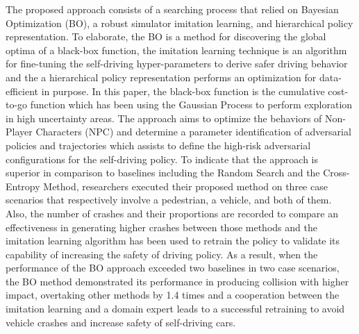 \documentclass[10pt,a4paper]{report}
\begin{document}
The proposed approach consists of a searching process that relied on Bayesian Optimization (BO), a robust simulator imitation learning, and hierarchical policy representation.
%
To elaborate, the BO is a method for discovering the global optima of a black-box function, the imitation learning technique is an algorithm for fine-tuning the self-driving hyper-parameters to derive safer driving behavior and the a hierarchical policy representation performs an optimization for data-efficient in purpose.
%
In this paper, the black-box function is the cumulative cost-to-go function which has been using the Gaussian Process to perform exploration in high uncertainty areas.
%
The approach aims to optimize the behaviors of Non-Player Characters (NPC)
%
and determine a parameter identification of adversarial policies and trajectories which assists to define the high-risk adversarial configurations for the self-driving policy. 
% 
To indicate that the approach is superior in comparison to baselines including the Random Search and the Cross-Entropy Method, researchers executed their proposed method on three case scenarios that respectively involve a pedestrian, a vehicle, and both of them.
%
Also, the number of crashes and their proportions are recorded to compare an effectiveness in generating higher crashes between those methods and
%
the imitation learning algorithm has been used to retrain the policy to validate its capability of increasing the safety of driving policy.
%
As a result, when the performance of the BO approach exceeded two baselines in two case scenarios, the BO method demonstrated its performance in producing collision with higher impact, overtaking other methods by 1.4 times and a cooperation between the imitation learning and a domain expert leads to a successful retraining to avoid vehicle crashes and increase safety of self-driving cars.
\end{document}
